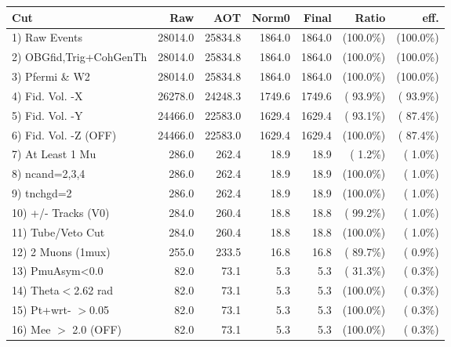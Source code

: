  \begin{table}[h!]\centering
 \begin{tabular}{||l||r|r|r|r|r|r||}
 \hline
 \hline
 Cut & Raw & AOT & Norm0 & Final & Ratio & eff.       \\
 \hline
  1) Raw Events           &      28014.0 &      25834.8 &       1864.0 &       1864.0 & (100.0\%) & (100.0\%) \\
  2) OBGfid,Trig+CohGenTh &      28014.0 &      25834.8 &       1864.0 &       1864.0 & (100.0\%) & (100.0\%) \\
  3) Pfermi \& W2         &      28014.0 &      25834.8 &       1864.0 &       1864.0 & (100.0\%) & (100.0\%) \\
  4) Fid. Vol. -X         &      26278.0 &      24248.3 &       1749.6 &       1749.6 & ( 93.9\%) & ( 93.9\%) \\
  5) Fid. Vol. -Y         &      24466.0 &      22583.0 &       1629.4 &       1629.4 & ( 93.1\%) & ( 87.4\%) \\
  6) Fid. Vol. -Z (OFF)   &      24466.0 &      22583.0 &       1629.4 &       1629.4 & (100.0\%) & ( 87.4\%) \\
  7) At Least 1 Mu        &        286.0 &        262.4 &         18.9 &         18.9 & (  1.2\%) & (  1.0\%) \\
  8) ncand=2,3,4          &        286.0 &        262.4 &         18.9 &         18.9 & (100.0\%) & (  1.0\%) \\
  9) tnchgd=2             &        286.0 &        262.4 &         18.9 &         18.9 & (100.0\%) & (  1.0\%) \\
 10) +/- Tracks (V0)      &        284.0 &        260.4 &         18.8 &         18.8 & ( 99.2\%) & (  1.0\%) \\
 11) Tube/Veto Cut        &        284.0 &        260.4 &         18.8 &         18.8 & (100.0\%) & (  1.0\%) \\
 12) 2 Muons (1mux)       &        255.0 &        233.5 &         16.8 &         16.8 & ( 89.7\%) & (  0.9\%) \\
 13) PmuAsym<0.0          &         82.0 &         73.1 &          5.3 &          5.3 & ( 31.3\%) & (  0.3\%) \\
 14) Theta$<$2.62 rad     &         82.0 &         73.1 &          5.3 &          5.3 & (100.0\%) & (  0.3\%) \\
 15) Pt+wrt- $>$0.05      &         82.0 &         73.1 &          5.3 &          5.3 & (100.0\%) & (  0.3\%) \\
 16) Mee $>$ 2.0  (OFF)   &         82.0 &         73.1 &          5.3 &          5.3 & (100.0\%) & (  0.3\%) \\

\end{tabular}
\end{table}
